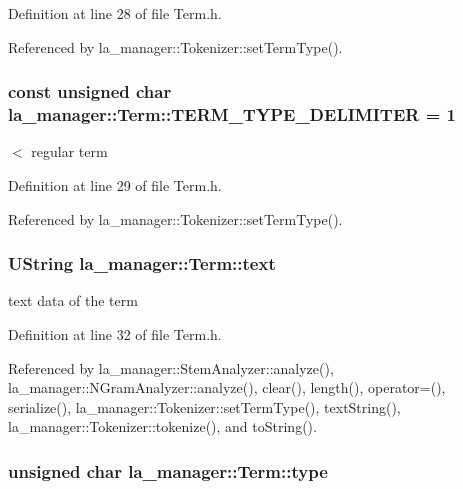 Definition at line 28 of file Term.h.

Referenced by la\_\-manager::Tokenizer::setTermType().\hypertarget{classla__manager_1_1Term_f7e0c80b4fb0bb1f9b49730475ea55b6}{
\subsubsection[{TERM\_\-TYPE\_\-DELIMITER}]{\setlength{\rightskip}{0pt plus 5cm}const unsigned char {\bf la\_\-manager::Term::TERM\_\-TYPE\_\-DELIMITER} = 1}}
\label{classla__manager_1_1Term_f7e0c80b4fb0bb1f9b49730475ea55b6}


$<$ regular term 



Definition at line 29 of file Term.h.

Referenced by la\_\-manager::Tokenizer::setTermType().\hypertarget{classla__manager_1_1Term_49c41450545995b9be0e34e05da6fbd1}{
\subsubsection[{text}]{\setlength{\rightskip}{0pt plus 5cm}UString {\bf la\_\-manager::Term::text}}}
\label{classla__manager_1_1Term_49c41450545995b9be0e34e05da6fbd1}


text data of the term 



Definition at line 32 of file Term.h.

Referenced by la\_\-manager::StemAnalyzer::analyze(), la\_\-manager::NGramAnalyzer::analyze(), clear(), length(), operator=(), serialize(), la\_\-manager::Tokenizer::setTermType(), textString(), la\_\-manager::Tokenizer::tokenize(), and toString().\hypertarget{classla__manager_1_1Term_6964a3845f56be2ee2627be3ef6266e5}{
\subsubsection[{type}]{\setlength{\rightskip}{0pt plus 5cm}unsigned char {\bf la\_\-manager::Term::type}}}
\label{classla__manager_1_1Term_6964a3845f56be2ee2627be3ef6266e5}


